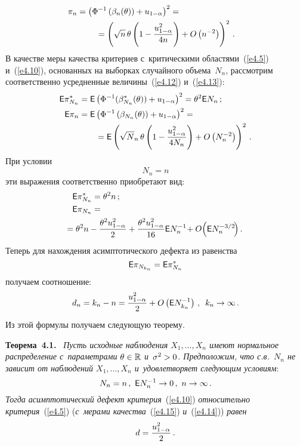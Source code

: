 \begin{multicols}{2}
\begin{align}
\\
\pi_n &= \left(\Phi^{-1}\left(\beta_n(\theta)\right) + u_{1-\alpha}\right)^2 ={}\notag\\
&\hspace*{8mm}{}=
\left(\sqrt n\, \theta \left(1 - \displaystyle\frac{\displaystyle u_{1-\alpha}^2\mathstrut}{\displaystyle 4n\mathstrut}\right) + 
 O\left(n^{-2}\right)\right)^2\,.
 \label{e4.13}
\end{align}
В качестве меры качества критериев с~критическими областями~(\ref{e4.5}) и~(\ref{e4.10}), 
основанных на выборках случайного объема~$N_n$, рассмотрим соответственно 
усредненные величины~(\ref{e4.12}) и~(\ref{e4.13}):
\begin{align*}
{\sf E} \pi_{N_n}^* &= {\sf E} \left(\Phi^{-1}(\beta_{N_n}^*(\theta)) + 
u_{1-\alpha}\right)^2 =\theta^2 {\sf E} N_n\,;
\\
{\sf E} \pi_n &= {\sf E} \left(\Phi^{-1}\left(\beta_{N_n}(\theta)\right) + 
u_{1-\alpha}\right)^2 ={}\\
&\hspace*{7mm}{}=
{\sf E} \left(\sqrt N_{n}\, \theta \left(1 - \displaystyle\frac{\displaystyle u_{1-\alpha}^2\mathstrut}{\displaystyle 4N_n\mathstrut}\right) +
O\left(N_{n}^{-2}\right)\right)^2\,.
\end{align*}
При условии
$$
N_n = n
$$
эти выражения соответственно приобретают вид:
\begin{align}
{\sf E} \pi_{N_n}^* &= \theta^2 n\,;
\label{e4.14}
\\
{\sf E} \pi_{N_n}& ={}\notag\\
&\hspace*{-11.5mm}{}= \theta^2 n - \fr{\theta^2 u_{1-\alpha}^2}{2} + 
\fr{\theta^2 u_{1-\alpha}^2}{16} {\sf E} N_n^{-1}\! +  O\!\left({\sf E} N_{n}^{-3/2}\!\right).\!\!\!
\label{e4.15}
\end{align}
Теперь для нахождения асимптотического дефекта из равенства
$$
{\sf E} \pi_{N_{k_n}} = {\sf E} \pi_{N_n}^*
$$
получаем соотношение:
\begin{equation*}
d_n = k_n - n = \displaystyle\frac{\displaystyle u_{1-\alpha}^2\mathstrut}{\displaystyle 2\mathstrut} +  O\left({\sf E} N_{k_n}^{-1}\right)\,,\enskip
k_n \to \infty\,.
\end{equation*}
Из этой формулы получаем следующую теорему.

\smallskip

\noindent
\textbf{Теорема~4.1.}\ \textit{
Пусть исходные наблюдения $X_1,\ldots,X_n$ имеют нормальное распределение 
с~параметрами $\theta\hm \in \mathbb{R}$ и~$\sigma^2\hm > 0$. Предположим, что 
с.в.~$N_{n}$ не зависит от наблюдений $X_1,\ldots,X_n$ и~удовлетворяет 
сле\-ду\-ющим условиям}:
$$
N_n = n\,,\  {\sf E} N_{n}^{-1} \to 0\,,\  n \to \infty\,.
$$
\textit{Тогда асимптотический дефект критерия}~(\ref{e4.10}) 
\textit{относительно критерия}~(\ref{e4.5}) 
(\textit{с~мерами качества}~(\ref{e4.15}) \textit{и}~(\ref{e4.14})) \textit{равен}
$$
d = \displaystyle\frac{\displaystyle u_{1-\alpha}^2\mathstrut}{\displaystyle 2\mathstrut}\,.
$$



\end{multicols}
